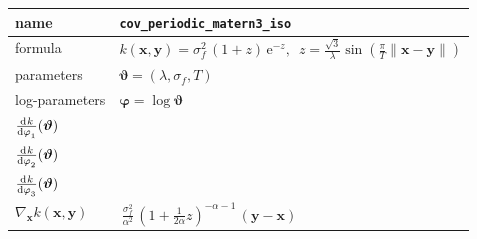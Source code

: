 \documentclass{article}
\newcommand{\NL}{\\ \midrule} %
\newcommand{\bx}{\bm{x}}
\newcommand{\by}{\bm{y}}
\newcommand{\btheta}{\bm{\vartheta}}
\newcommand{\bphi}{\bm{\varphi}}
\begin{document}
\begin{tabularx}{\textwidth}{@{} X X @{}}
%
 name &    \verb|cov_periodic_matern3_iso|   \NL
 formula &   $\displaystyle k(\bx,\by) = \sigma_f^2 \, (1+z)\, \textrm{e}^{-z}, \,\,\, z = \frac{\sqrt{3}}{\lambda} \sin( \frac{\pi}{T}\| \bx-\by \| ) $ \NL
% 
parameters & $\btheta = (\lambda, \sigma_f , T)$  \NL
% 
log-parameters & $\displaystyle \bphi = \log \btheta $ \NL
%
$\displaystyle \od{k}{\varphi_1}(\btheta)$ &     \NL
$\displaystyle \od{k}{\varphi_2}(\btheta)$ &     \NL
$\displaystyle \od{k}{\varphi_3}(\btheta)$ &     \NL
%
$\displaystyle \nabla_{\bx} k(\bx, \by)$ &  $\displaystyle   \, \frac{\sigma_f^2}{\alpha^2}   \, \left(     1+\frac{1}{2\alpha}z  \right)^{-\alpha-1}  \, (\by-\bx) $    \NL 
%
\end{tabularx}
\end{document}
